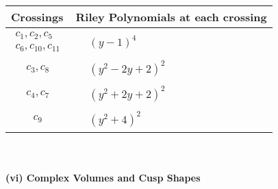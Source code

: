 \documentclass[1p]{elsarticle_modified}
\theoremstyle{definition}
\begin{document}
\begin{tabular}{m{50pt}|m{274pt}}
Crossings & \hspace{64pt}Riley Polynomials at each crossing \\
\hline $$\begin{aligned}c_{1},c_{2},c_{5}\\c_{6},c_{10},c_{11}\end{aligned}$$&$\begin{aligned}
&(y-1)^4
\end{aligned}$\\
\hline $$\begin{aligned}c_{3},c_{8}\end{aligned}$$&$\begin{aligned}
&(y^2-2 y+2)^2
\end{aligned}$\\
\hline $$\begin{aligned}c_{4},c_{7}\end{aligned}$$&$\begin{aligned}
&(y^2+2 y+2)^2
\end{aligned}$\\
\hline $$\begin{aligned}c_{9}\end{aligned}$$&$\begin{aligned}
&(y^2+4)^2
\end{aligned}$\\
\hline
\end{tabular}\\~\\
\newpage\flushleft \textbf{(vi) Complex Volumes and Cusp Shapes}
\end{document}
